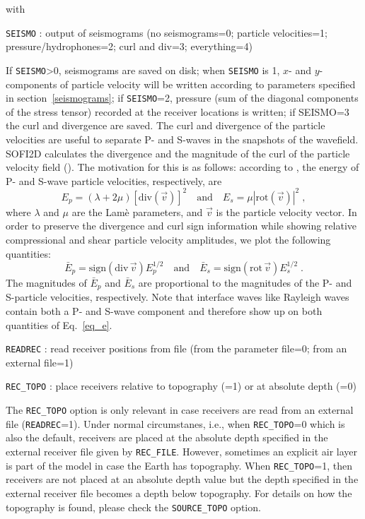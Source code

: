 with

\texttt{SEISMO} : output of seismograms (no seismograms=0; particle velocities=1; pressure/hydrophones=2; curl and div=3; everything=4)

If \texttt{SEISMO}>0, seismograms are saved on disk; when \texttt{SEISMO} is 1, $x$- and $y$-components of particle velocity will be written according to parameters specified in section~\ref{seismograms}; if \texttt{SEISMO}=2, pressure (sum of the diagonal components of the stress tensor) recorded at the receiver locations is written; if SEISMO=3 the curl and divergence are saved. The curl and divergence of the particle velocities are useful to separate P- and S-waves in the snapshots of the wavefield. SOFI2D calculates the divergence and the magnitude of the curl of the particle velocity field (\cite{dougherty:88}). The motivation for this is as follows: according to \citet{morse:53}, the energy of P- and S-wave particle velocities, respectively, are
\begin{equation}
    E_p=\left(\lambda + 2 \mu\right) \left[ \text{div}(\vec{v}) \right]^2 \quad \mbox{and} \quad E_s=\mu \left|\text{rot}(\vec{v})\right|^2\;,
    \label{eq_E}
\end{equation}
where $\lambda$ and $\mu$ are the Lam\`{e} parameters, and $\vec{v}$ is the particle velocity vector. In order to preserve the divergence and curl sign information  while showing relative compressional and shear particle velocity amplitudes, we plot the following quantities:
\begin{equation}
    \bar{E}_p = \text{sign}(\text{div}\,\vec{v}) E_p^{1/2} \quad \mbox{and} \quad \bar{E}_s= \text{sign}(\text{rot}\,\vec{v}) E_s^{1/2}\;.
    \label{eq_e}
\end{equation}
The magnitudes of $\bar{E}_p$ and $\bar{E}_s$ are proportional to the magnitudes of the P- and S-particle velocities, respectively. Note that interface waves like Rayleigh waves contain both a P- and S-wave component and therefore show up on both quantities of Eq.~\ref{eq_e}.

\texttt{READREC} : read receiver positions from file (from the parameter file=0; from an external file=1)

\texttt{REC\_TOPO} : place receivers relative to topography (=1) or at absolute depth (=0)

The \texttt{REC\_TOPO} option is only relevant in case receivers are read from an external file (\texttt{READREC}=1). Under normal circumstanes, i.e., when \texttt{REC\_TOPO}=0 which is also the default, receivers are placed at the absolute depth specified in the external receiver file given by \texttt{REC\_FILE}. However, sometimes an explicit air layer is part of the model in case the Earth has topography. When \texttt{REC\_TOPO}=1, then receivers are not placed at an absolute depth value but the depth specified in the external receiver file becomes a depth below topography. For details on how the topography is found, please check the \texttt{SOURCE\_TOPO} option.

